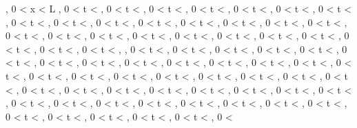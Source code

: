 \documentclass[
  ukrainian,
]{article}
\begin{document}
, 0 \textless{} x \textless{} L , 0 \textless{} t \textless{} \infty , 0
\textless{} t \textless{} \infty , 0 \textless{} t \textless{} \infty ,
0 \textless{} t \textless{} \infty , 0 \textless{} t \textless{}
\infty , 0 \textless{} t \textless{} \infty , 0 \textless{} t
\textless{} \infty , 0 \textless{} t \textless{} \infty , 0 \textless{}
t \textless{} \infty , 0 \textless{} t \textless{} \infty , 0
\textless{} t \textless{} \infty , 0 \textless{} t \textless{} \infty ,
0 \textless{} t \textless{} \infty , 0 \textless{} t \textless{}
\infty , 0 \textless{} t \textless{} \infty , 0 \textless{} t
\textless{} \infty , 0 \textless{} t \textless{} \infty , 0 \textless{}
t \textless{} \infty , 0 \textless{} t \textless{} \infty , 0
\textless{} t \textless{} \infty , 0 \textless{} t \textless{} \infty ,
0 \textless{} t \textless{} \infty , 0 \textless{} t \textless{}
\infty , 0 \textless{} t \textless{} \infty , 0 \textless{} t
\textless{} \infty , 0 \textless{} t \textless{} \infty , , 0
\textless{} t \textless{} \infty , 0 \textless{} t \textless{} \infty ,
0 \textless{} t \textless{} \infty , 0 \textless{} t \textless{}
\infty , 0 \textless{} t \textless{} \infty , 0 \textless{} t
\textless{} \infty , 0 \textless{} t \textless{} \infty , 0 \textless{}
t \textless{} \infty , 0 \textless{} t \textless{} \infty , 0
\textless{} t \textless{} \infty , 0 \textless{} t \textless{} \infty ,
0 \textless{} t \textless{} \infty , 0 \textless{} t \textless{}
\infty , 0 \textless{} t \textless{} \infty , 0 \textless{} t
\textless{} \infty , 0 \textless{} t \textless{} \infty , 0 \textless{}
t \textless{} \infty , 0 \textless{} t \textless{} \infty , 0
\textless{} t \textless{} \infty , 0 \textless{} t \textless{} \infty ,
0 \textless{} t \textless{} \infty , 0 \textless{} t \textless{}
\infty , 0 \textless{} t \textless{} \infty , 0 \textless{} t
\textless{} \infty , 0 \textless{} t \textless{} \infty , 0 \textless{}
t \textless{} \infty , 0 \textless{} t \textless{} \infty , 0
\textless{} t \textless{} \infty , 0 \textless{} t \textless{} \infty ,
0 \textless{} t \textless{} \infty , 0 \textless{} t \textless{}
\infty , 0 \textless{} t \textless{} \infty , 0 \textless{} t
\textless{} \infty , 0 \textless{} t \textless{} \infty , 0 \textless{}
t \textless{} \infty , 0 \textless{} t \textless{} \infty , 0
\textless{} t \textless{} \infty , 0 \textless{} t \textless{} \infty ,
0 \textless{} t \textless{} \infty , 0 \textless{} t \textless{}
\infty , 0 \textless{} t \textless{} \infty , 0 \textless{} t
\textless{} \infty , 0 \textless{} t \textless{} \infty , 0 \textless{}
\end{document}
